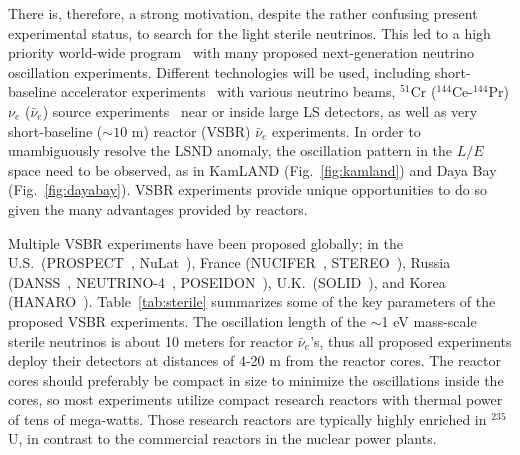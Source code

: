 \documentclass[aps,twocolumn,preprintnumbers,amsmath,superscriptaddress,amssymb,floats,nofootinbib]{revtex4-1}
\begin{document}
There is, therefore, a strong motivation, despite the rather confusing present experimental status, to search for the light sterile neutrinos.
This led to a high priority world-wide program~\cite{sterileWP} with many proposed next-generation neutrino oscillation experiments.
Different technologies will be used, including short-baseline accelerator experiments~\cite{IsoDAR,OscSNS,NESSiE,LAr1-ND,nuSTORM} with various neutrino beams,
$^{51}$Cr ($^{144}$Ce-$^{144}$Pr) $\nu_e$ ($\bar\nu_e$) source experiments~\cite{Cribier2011,Dwyer2013,SOX,CeLAND} near or inside large LS detectors, as well as very short-baseline ($\sim10$ m) reactor (VSBR) $\bar\nu_e$ experiments.
In order to unambiguously resolve the LSND anomaly, the oscillation pattern in the $L/E$ space need to be observed, as in KamLAND (Fig.~\ref{fig:kamland}) and Daya Bay (Fig.~\ref{fig:dayabay}).
VSBR experiments provide unique opportunities to do so given the many advantages provided by reactors.

Multiple VSBR experiments have been proposed globally; in the U.S.~(PROSPECT~\cite{PROSPECT}, NuLat~\cite{NuLat}), France (NUCIFER~\cite{NUCIFER-2010, NUCIFER-2014}, STEREO~\cite{sterileWP}), Russia (DANSS~\cite{DANSS}, NEUTRINO-4~\cite{NEUTRINO4-2012,NEUTRINO4-2014}, POSEIDON~\cite{POSEIDON}), U.K.~(SOLID~\cite{Lasserre-Neutrino14}), and Korea (HANARO~\cite{HANARO}).
Table~\ref{tab:sterile} summarizes some of the key parameters of the proposed VSBR experiments.
The oscillation length of the $\sim$1 eV mass-scale sterile neutrinos is about 10 meters for reactor $\bar\nu_e$'s, thus all proposed experiments deploy their detectors at distances of 4-20 m from the reactor cores.
The reactor cores should preferably be compact in size to minimize the oscillations inside the cores,
so most experiments utilize compact research reactors with thermal power of tens of mega-watts. Those research reactors are typically highly enriched in $^{235}$U, in contrast to the commercial reactors in the nuclear power plants.
\end{document}
